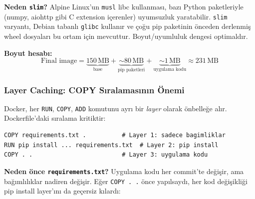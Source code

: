 \textbf{Neden \texttt{slim}?} Alpine Linux'un \texttt{musl} libc kullanmas{\i}, baz{\i} Python paketleriyle (numpy, aiohttp gibi C extension i\c{c}erenler) uyumsuzluk yaratabilir. \texttt{slim} varyant{\i}, Debian tabanl{\i} \texttt{glibc} kullan{\i}r ve \c{c}o\u{g}u pip paketinin \"{o}nceden derlenmi\c{s} wheel dosyalar{\i} bu ortam i\c{c}in mevcuttur. Boyut/uyumluluk dengesi optimald{\i}r.

\textbf{Boyut hesab{\i}:}
\begin{equation}
\label{eq:image-size}
\text{Final image} = \underbrace{150\,\text{MB}}_{\text{base}} + \underbrace{\sim 80\,\text{MB}}_{\text{pip paketleri}} + \underbrace{\sim 1\,\text{MB}}_{\text{uygulama kodu}} \approx 231\,\text{MB}
\end{equation}

\subsubsection{Layer Caching: COPY S{\i}ralamas{\i}n{\i}n \"{O}nemi}

Docker, her \texttt{RUN}, \texttt{COPY}, \texttt{ADD} komutunu ayr{\i} bir \emph{layer} olarak \"{o}nbelle\u{g}e al{\i}r. Dockerfile'daki s{\i}ralama kritiktir:

\begin{verbatim}
COPY requirements.txt .          # Layer 1: sadece bagimliklar
RUN pip install ... requirements.txt  # Layer 2: pip install
COPY . .                         # Layer 3: uygulama kodu
\end{verbatim}

\textbf{Neden \"{o}nce \texttt{requirements.txt}?} Uygulama kodu her commit'te de\u{g}i\c{s}ir, ama ba\u{g}{\i}ml{\i}l{\i}klar nadiren de\u{g}i\c{s}ir. E\u{g}er \texttt{COPY . .} \"{o}nce yap{\i}lsayd{\i}, her kod de\u{g}i\c{s}ikli\u{g}i pip install layer'{\i}n{\i} da ge\c{c}ersiz k{\i}lard{\i}:

